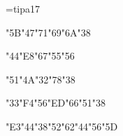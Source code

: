\nopagenumbers
\font\ipa=tipa17


\ipa\char"5B\ipa\char"47\ipa\char"71\ipa\char"69\ipa\char"6A\ipa\char"38

\ipa\char"44\ipa\char"E8\ipa\char"67\ipa\char"55\ipa\char"56

\ipa\char"51\ipa\char"4A\ipa\char"32\ipa\char"78\ipa\char"38

\ipa\char"33\ipa\char"F4\ipa\char"56\ipa\char"ED\ipa\char"66\ipa\char"51\ipa\char"38

\ipa\char"E3\ipa\char"44\ipa\char"38\ipa\char"52\ipa\char"62\ipa\char"44\ipa\char"56\ipa\char"5D\bye